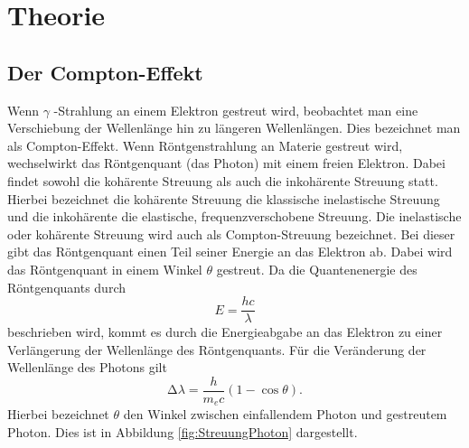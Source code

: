 \section{Theorie}
\label{sec:Theorie}



\subsection{Der Compton-Effekt}
\label{sec:comptoneffekt}
Wenn $\gamma$ -Strahlung an einem Elektron gestreut wird, beobachtet man eine Verschiebung der Wellenlänge hin zu längeren Wellenlängen.
Dies bezeichnet man als Compton-Effekt.
Wenn Röntgenstrahlung an Materie gestreut wird, wechselwirkt das Röntgenquant (das Photon) mit einem freien Elektron.
Dabei findet sowohl die kohärente Streuung als auch die inkohärente Streuung statt. Hierbei bezeichnet die kohärente Streuung
die klassische inelastische Streuung und die inkohärente die elastische, frequenzverschobene Streuung.
Die inelastische oder kohärente Streuung wird auch als Compton-Streuung bezeichnet.
Bei dieser gibt das Röntgenquant einen Teil seiner Energie an das Elektron ab. Dabei wird das Röntgenquant in einem Winkel $\theta$
gestreut. Da die Quantenenergie des Röntgenquants durch
\begin{equation}
	E =  \frac{h c}{\lambda}
	\label{eqn:E=hc/lambda}
\end{equation}
beschrieben wird, kommt es durch die Energieabgabe an das Elektron zu einer Verlängerung der Wellenlänge des Röntgenquants.
Für die Veränderung der Wellenlänge des Photons gilt
\begin{equation}
	\increment \lambda = \frac{h}{m_e c} (1- \cos  \theta).
	\label{eqn:deltalambda}
\end{equation}
Hierbei bezeichnet $\theta$ den Winkel zwischen einfallendem Photon und gestreutem Photon. Dies ist in Abbildung \ref{fig:StreuungPhoton}
dargestellt.
